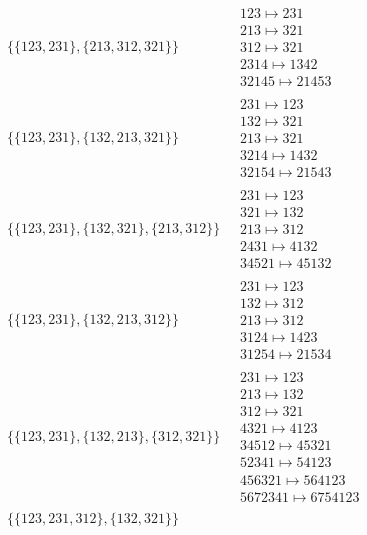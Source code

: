 \begin{scriptsize}
\begin{align}
\begin{matrix}
\end{matrix}
\\
\{\{123, 231\}, \{213, 312, 321\}\}
\ 
&
\begin{matrix}
123 \mapsto 231\\213 \mapsto 321\\312 \mapsto 321\\2314 \mapsto 1342\\32145 \mapsto 21453
\end{matrix}
\\
\{\{123, 231\}, \{132, 213, 321\}\}
\ 
&
\begin{matrix}
231 \mapsto 123\\132 \mapsto 321\\213 \mapsto 321\\3214 \mapsto 1432\\32154 \mapsto 21543
\end{matrix}
\\
\{\{123, 231\}, \{132, 321\}, \{213, 312\}\}
\ 
&
\begin{matrix}
231 \mapsto 123\\321 \mapsto 132\\213 \mapsto 312\\2431 \mapsto 4132\\34521 \mapsto 45132
\end{matrix}
\\
\{\{123, 231\}, \{132, 213, 312\}\}
\ 
&
\begin{matrix}
231 \mapsto 123\\132 \mapsto 312\\213 \mapsto 312\\3124 \mapsto 1423\\31254 \mapsto 21534
\end{matrix}
\\
\{\{123, 231\}, \{132, 213\}, \{312, 321\}\}
\ 
&
\begin{matrix}
231 \mapsto 123\\213 \mapsto 132\\312 \mapsto 321\\4321 \mapsto 4123\\34512 \mapsto 45321\\52341 \mapsto 54123\\456321 \mapsto 564123\\5672341 \mapsto 6754123
\end{matrix}
\\
\{\{123, 231, 312\}, \{132, 321\}\}
\ 
&
\begin{matrix}

\end{matrix}
\end{align}
\end{scriptsize}
